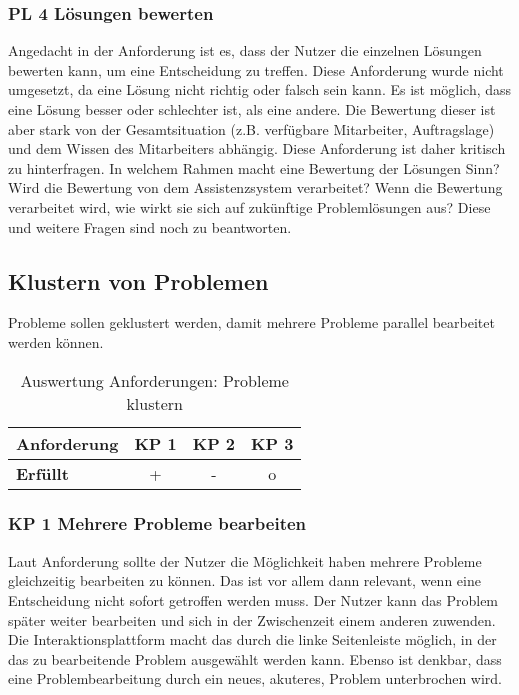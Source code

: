 \subsubsection*{PL 4 Lösungen bewerten}
Angedacht in der Anforderung ist es, dass der Nutzer die einzelnen Lösungen bewerten kann, um eine Entscheidung zu treffen. Diese Anforderung wurde nicht umgesetzt, da eine Lösung nicht richtig oder falsch sein kann. Es ist möglich, dass eine Lösung besser oder schlechter ist, als eine andere. Die Bewertung dieser ist aber stark von der Gesamtsituation (z.B. verfügbare Mitarbeiter, Auftragslage) und dem Wissen des Mitarbeiters abhängig. Diese Anforderung ist daher kritisch zu hinterfragen. In welchem Rahmen macht eine Bewertung der Lösungen Sinn? Wird die Bewertung von dem Assistenzsystem verarbeitet? Wenn die Bewertung verarbeitet wird, wie wirkt sie sich auf zukünftige Problemlösungen aus? Diese und weitere Fragen sind noch zu beantworten.

\subsection{Klustern von Problemen}
Probleme sollen geklustert werden, damit mehrere Probleme parallel bearbeitet werden können. 

\begin{table}[htbp]
\centering
\begin{tabular}{l|c|c|c}
\textbf{Anforderung} & KP 1 & KP 2 & KP 3\\
\hline
\textbf{Erfüllt} & + & - & o\\
\end{tabular}
\caption{Auswertung Anforderungen: Probleme klustern}
\end{table}

\subsubsection*{KP 1 Mehrere Probleme bearbeiten}
Laut Anforderung sollte der Nutzer die Möglichkeit haben mehrere Probleme gleichzeitig bearbeiten zu können. Das ist vor allem dann relevant, wenn eine Entscheidung nicht sofort getroffen werden muss. Der Nutzer kann das Problem später weiter bearbeiten und sich in der Zwischenzeit einem anderen zuwenden. Die Interaktionsplattform macht das durch die linke Seitenleiste möglich, in der das zu bearbeitende Problem ausgewählt werden kann. Ebenso ist denkbar, dass eine Problembearbeitung durch ein neues, akuteres, Problem unterbrochen wird.

